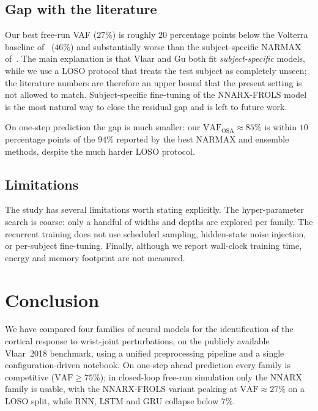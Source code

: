 \documentclass[conference]{IEEEtran}
\begin{document}
\subsection{Gap with the literature}

Our best free-run VAF ($27\%$) is roughly $20$ percentage points below
the Volterra baseline of~\cite{Vlaar2018} ($46\%$) and substantially
worse than the subject-specific NARMAX of~\cite{Gu2021}. The main
explanation is that Vlaar and Gu both fit
\emph{subject-specific} models, while we use a LOSO protocol that
treats the test subject as completely unseen; the literature numbers
are therefore an upper bound that the present setting is not allowed
to match. Subject-specific fine-tuning of the NNARX-FROLS model is the
most natural way to close the residual gap and is left to future work.

On one-step prediction the gap is much smaller: our
$\mathrm{VAF_{OSA}}\approx 85\%$ is within $10$ percentage points of
the $94\%$ reported by the best NARMAX and ensemble methods, despite
the much harder LOSO protocol.

\subsection{Limitations}
The study has several limitations worth stating explicitly. The
hyper-parameter search is coarse: only a handful of widths and depths
are explored per family. The recurrent training does not use
scheduled sampling, hidden-state noise injection, or per-subject
fine-tuning. Finally, although we report wall-clock training time,
energy and memory footprint are not measured.

\section{Conclusion}\label{sec:conclusion}

We have compared four families of neural models for the
identification of the cortical response to wrist-joint perturbations,
on the publicly available Vlaar~2018 benchmark, using a unified
preprocessing pipeline and a single configuration-driven notebook.
On one-step ahead prediction every family is competitive
($\mathrm{VAF}\geq 75\%$); in closed-loop free-run simulation only the
NNARX family is usable, with the NNARX-FROLS variant peaking at
$\mathrm{VAF}\approx 27\%$ on a LOSO split, while RNN, LSTM and GRU
collapse below $7\%$.
\end{document}
